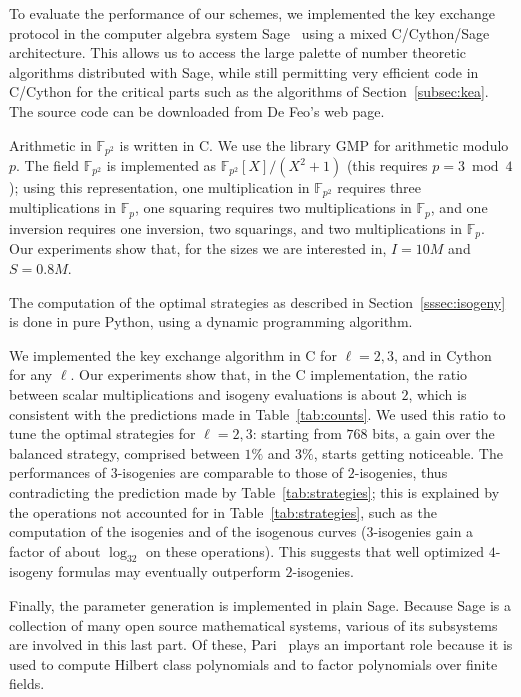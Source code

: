 \documentclass[jmc]{degruyter-journal-a}
\theoremstyle{definition}
\newcommand{\FF}{{\mathbb{F}}}
\begin{document}
To evaluate the performance of our schemes, we implemented the key
exchange protocol in the computer algebra system Sage~\cite{Sage}
using a mixed C/Cython/Sage architecture. This allows us to access the
large palette of number theoretic algorithms distributed with Sage,
while still permitting very efficient code in C/Cython for the
critical parts such as the algorithms of Section~\ref{subsec:kea}. The
source code can be downloaded from De Feo's web page.

Arithmetic in $\FF_{p^2}$ is written in C. We use the library GMP for
arithmetic modulo $p$. The field $\FF_{p^2}$ is implemented as
$\FF_{p^2}[X]/(X^2+1)$ (this requires $p=3\bmod4$); using this
representation, one multiplication in $\FF_{p^2}$ requires three
multiplications in $\FF_p$, one squaring requires two
multiplications in $\FF_p$, and one inversion requires one
inversion, two squarings, and two multiplications in $\FF_p$. Our
experiments show that, for the sizes we are interested in, $I=10M$ and
$S=0.8M$.

The computation of the optimal strategies as described in
Section~\ref{sssec:isogeny} is done in pure Python, using a dynamic
programming algorithm.

We implemented the key exchange algorithm in C for $\ell=2,3$, and in
Cython for any $\ell$. Our experiments show that, in the C
implementation, the ratio between scalar multiplications and isogeny
evaluations is about $2$, which is consistent with the predictions
made in Table~\ref{tab:counts}. We used this ratio to tune the optimal
strategies for $\ell=2,3$: starting from $768$ bits, a gain over the
balanced strategy, comprised between $1\%$ and $3\%$, starts getting
noticeable. The performances of $3$-isogenies are comparable to those
of $2$-isogenies, thus contradicting the prediction made by
Table~\ref{tab:strategies}; this is explained by the operations not
accounted for in Table~\ref{tab:strategies}, such as the computation
of the isogenies and of the isogenous curves ($3$-isogenies gain a
factor of about $\log_32$ on these operations). This suggests that
well optimized $4$-isogeny formulas may eventually outperform
$2$-isogenies.

Finally, the parameter generation is implemented in plain
Sage. Because Sage is a collection of many open source mathematical
systems, various of its subsystems are involved in this last part. Of
these, Pari~\cite{Pari} plays an important role because it is used to
compute Hilbert class polynomials and to factor polynomials over
finite fields.
\end{document}
